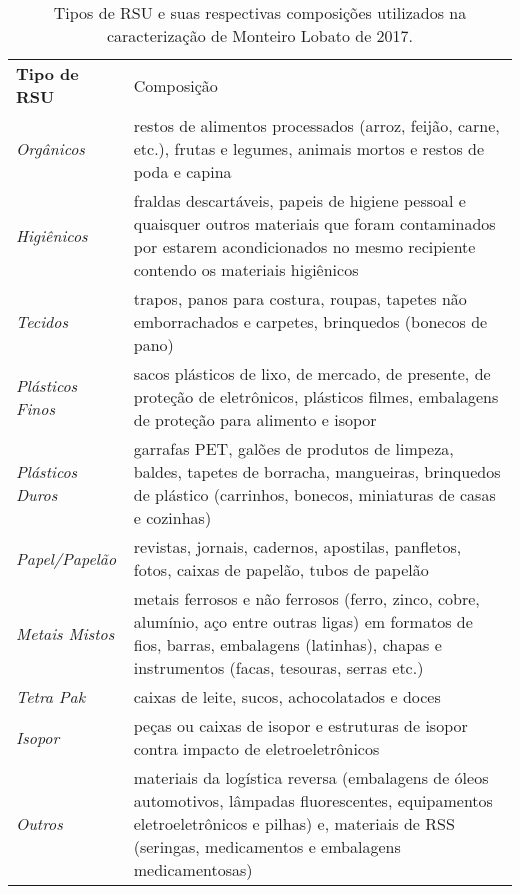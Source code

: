 \begin{table}[htbp]
  \centering
  \caption{Tipos de RSU e suas respectivas composições utilizados na caracterização de Monteiro Lobato de 2017.}
    \begin{tabular}{P{9.93em}|P{22.715em}}
     \textcolor[rgb]{ 1,  1,  1}{\textbf{Tipo de RSU}} & \textcolor[rgb]{ 1,  1,  1}{Composição  } \\
     \textit{Orgânicos} & restos de alimentos processados (arroz, feijão, carne, etc.), frutas e legumes, animais mortos e restos de poda e capina \\
     \textit{Higiênicos} & fraldas descartáveis, papeis de higiene pessoal e quaisquer outros materiais que foram contaminados por estarem acondicionados no mesmo recipiente contendo os materiais higiênicos \\
     \textit{Tecidos} & trapos, panos para costura, roupas, tapetes não emborrachados e carpetes, brinquedos (bonecos de pano) \\
     \textit{Plásticos Finos} & sacos plásticos de lixo, de mercado, de presente, de proteção de eletrônicos, plásticos filmes, embalagens de proteção para alimento e isopor \\
     \textit{Plásticos Duros} & garrafas PET, galões de produtos de limpeza, baldes, tapetes de borracha, mangueiras, brinquedos de plástico (carrinhos, bonecos, miniaturas de casas e cozinhas) \\
     \textit{Papel/Papelão} & revistas, jornais, cadernos, apostilas, panfletos, fotos, caixas de papelão, tubos de papelão \\
     \textit{Metais Mistos} & metais ferrosos e não ferrosos (ferro, zinco, cobre, alumínio, aço entre outras ligas) em formatos de fios, barras, embalagens (latinhas), chapas e instrumentos (facas, tesouras, serras etc.) \\
     \textit{Tetra Pak} & caixas de leite, sucos, achocolatados e doces \\
     \textit{Isopor} & peças ou caixas de isopor e estruturas de isopor contra impacto de eletroeletrônicos \\
     \textit{Outros} & materiais da logística reversa (embalagens de óleos automotivos, lâmpadas fluorescentes, equipamentos eletroeletrônicos e pilhas) e, materiais de RSS (seringas, medicamentos e embalagens medicamentosas) \\
    \end{tabular}%
  \label{tab:tipo_rsu_ml}%
\end{table}%
